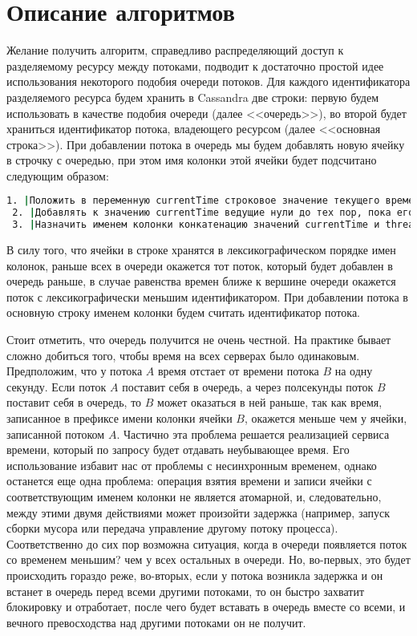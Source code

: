 \section{Описание алгоритмов}

Желание получить алгоритм, справедливо распределяющий доступ к разделяемому ресурсу между потоками, подводит к достаточно простой идее использования некоторого подобия очереди потоков.
Для каждого идентификатора разделяемого ресурса будем хранить в Cassandra две строки: первую будем использовать в качестве подобия очереди (далее <<очередь>>), во второй будет храниться идентификатор потока, владеющего ресурсом (далее <<основная строка>>).
При добавлении потока в очередь мы будем добавлять новую ячейку в строчку с очередью, при этом имя колонки этой ячейки будет подсчитано следующим образом:

\begin{lstlisting}[language=csh,caption={Определение имени колонки для ячейки в очереди}]
 1. |Положить в переменную currentTime строковое значение текущего времени в микросекундах|
 2. |Добавлять к значению currentTime ведущие нули до тех пор, пока его длина не станет равной 20|
 3. |Назначить именем колонки конкатенацию значений currentTime и threadId|
\end{lstlisting}

В силу того, что ячейки в строке хранятся в лексикографическом порядке имен колонок, раньше всех в очереди окажется тот поток, который будет добавлен в очередь раньше, в случае равенства времен ближе к вершине очереди окажется поток с лексикографически меньшим идентификатором.
При добавлении потока в основную строку именем колонки будем считать идентификатор потока.

Стоит отметить, что очередь получится не очень честной. На практике бывает сложно добиться того, чтобы время на всех серверах было одинаковым. Предположим, что у потока $A$ время отстает от времени потока $B$ на одну секунду. Если поток $A$ поставит себя в очередь, а через полсекунды поток $B$ поставит себя в очередь, то $B$ может оказаться в ней раньше, так как время, записанное в префиксе имени колонки ячейки $B$, окажется меньше чем у ячейки, записанной потоком $A$. Частично эта проблема решается реализацией сервиса времени, который по запросу будет отдавать неубывающее время. Его использование избавит нас от проблемы с несинхронным временем, однако останется еще одна проблема: операция взятия времени и записи ячейки с соответствующим именем колонки не является атомарной, и, следовательно, между этими двумя действиями может произойти задержка (например, запуск сборки мусора или передача управление другому потоку процесса).
Соответственно до сих пор возможна ситуация, когда в очереди появляется поток со временем меньшим? чем у всех остальных в очереди.
Но, во-первых, это будет происходить гораздо реже, во-вторых, если у потока возникла задержка и он встанет в очередь перед всеми другими потоками, то он быстро захватит блокировку и отработает, после чего будет вставать в очередь вместе со всеми, и вечного превосходства над другими потоками он не получит.
